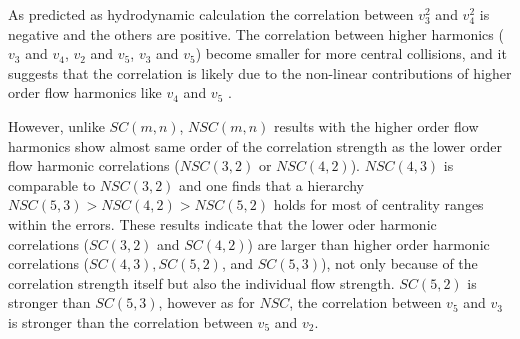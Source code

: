 As predicted as hydrodynamic calculation \cite{Bhalerao:2015jg} the correlation between $v_3^2$ and $v_4^2$ is negative and the others are positive. The correlation between higher harmonics ($v_3$ and $v_4$, $v_2$ and $v_5$, $v_3$ and $v_5$) become smaller for more central collisions, and it suggests that the correlation is likely due to the non-linear contributions of higher order flow harmonics like $v_4$ and $v_5$ \cite{PhysRevC.85.024908}. 

However, unlike $SC(m,n)$, $NSC(m,n)$ results with the higher order flow harmonics show almost same order of the correlation strength as the lower order flow harmonic correlations ($NSC(3,2)$ or $NSC(4,2)$). $NSC(4,3)$ is comparable to $NSC(3,2)$ and one finds that a hierarchy $NSC(5,3) > NSC(4,2) > NSC(5,2)$ holds for most of centrality ranges within the errors.
These results indicate that the lower oder harmonic correlations ($SC(3,2)$ and $SC(4,2)$) are larger than higher order harmonic correlations ($SC(4,3), SC(5,2)$, and $SC(5,3)$), not only because of the correlation strength itself but also the individual flow strength. 
$SC(5,2)$ is stronger than $SC(5,3)$, however as for $NSC$, the correlation between $v_5$ and $v_3$ is stronger than the correlation between $v_5$ and $v_2$. 


